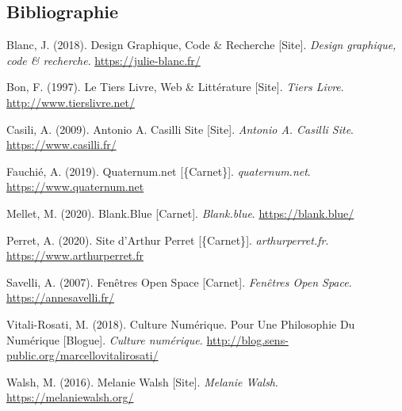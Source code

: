 \documentclass[12pt,french,letterpaper]{article}
\begin{document}
{\hypertarget{bibliographie}{%
\subsection*{Bibliographie}\label{bibliographie}}

\hypertarget{refs}{}
\begin{CSLReferences}{1}{0}
\leavevmode{}%
Blanc, J. (2018). Design Graphique, Code \& Recherche {[}Site{]}.
\emph{Design graphique, code \& recherche}.
\url{https://julie-blanc.fr/}

\leavevmode{}%
Bon, F. (1997). Le {Tiers} Livre, Web \& Littérature {[}Site{]}.
\emph{Tiers Livre}. \url{http://www.tierslivre.net/}

\leavevmode{}%
Casili, A. (2009). Antonio {A}. {Casilli Site} {[}Site{]}. \emph{Antonio
A. Casilli Site}. \url{https://www.casilli.fr/}

\leavevmode{}%
Fauchié, A. (2019). {Quaternum.net} {[}\{Carnet\}{]}.
\emph{quaternum.net}. \url{https://www.quaternum.net}

\leavevmode{}%
Mellet, M. (2020). Blank.Blue {[}Carnet{]}. \emph{Blank.blue}.
\url{https://blank.blue/}

\leavevmode{}%
Perret, A. (2020). {Site d'Arthur Perret} {[}\{Carnet\}{]}.
\emph{arthurperret.fr}. \url{https://www.arthurperret.fr}

\leavevmode{}%
Savelli, A. (2007). Fenêtres {Open Space} {[}Carnet{]}. \emph{Fenêtres
Open Space}. \url{https://annesavelli.fr/}

\leavevmode{}%
Vitali-Rosati, M. (2018). Culture Numérique. {Pour} Une Philosophie Du
Numérique {[}Blogue{]}. \emph{Culture numérique.}
\url{http://blog.sens-public.org/marcellovitalirosati/}

\leavevmode{}%
Walsh, M. (2016). Melanie {Walsh} {[}Site{]}. \emph{Melanie Walsh}.
\url{https://melaniewalsh.org/}

\end{CSLReferences}}
\end{document}
